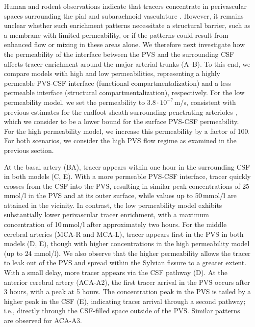 \documentclass[fleqn,10pt]{wlscirep}
\begin{document}
Human and rodent observations indicate that tracers concentrate in perivascular spaces surrounding the pial and subarachnoid vasculature \cite{zhang1990interrelationships,zhang1992directional, bedussi2017paravascular, mestre2018flow, bedussi2018paravascular, eide2024functional}. However, it remains unclear whether such enrichment patterns necessitate a structural barrier, such as a membrane with limited permeability, or if the patterns could result from enhanced flow or mixing in these areas alone. We therefore next investigate how the permeability of the interface between the PVS and the surrounding CSF affects tracer enrichment around the major arterial trunks (A--B). To this end, we compare models with high and low  permeabilities, representing a highly permeable PVS-CSF interface (functional compartmentalization) and a less permeable interface (structural compartmentalization), respectively. For the low permeability model, we set the permeability to $3.8 \cdot 10^{-7}\,$m/s, consistent with previous estimates for the endfoot sheath surrounding penetrating arterioles \cite{koch2023estimates}, which we consider to be a lower bound for the surface PVS-CSF permeability. For the high permeability model, we increase this permeability by a factor of 100. For both scenarios, we consider the high PVS flow regime as examined in the previous section.

At the basal artery (BA), tracer appears within one hour in the surrounding CSF in both models (C, E). With a more permeable PVS-CSF interface, tracer quickly crosses from the CSF into the PVS, resulting in similar peak concentrations of 25\,mmol/l in the PVS and at its outer surface, while values up to 50\,mmol/l are attained in the vicinity. In contrast, the low permeability model exhibits substantially lower perivascular tracer enrichment, with a maximum concentration of 10\,mmol/l after approximately two hours.
For the middle cerebral arteries (MCA-R and MCA-L), tracer appears
first in the PVS in both models (D, E),
though with higher concentrations in the high permeability model (up
to 24 mmol/l). We also observe that the higher permeability allows the
tracer to leak out of the PVS and spread within the Sylvian fissure to
a greater extent. With a small delay, more tracer appears via
  the CSF pathway (D). At the anterior cerebral artery (ACA-A2), the first tracer arrival in the PVS occurs after 3 hours, with a peak at 5 hours. The concentration peak in the PVS is tailed by a higher peak in the CSF (E), indicating tracer arrival through a second pathway; i.e., directly through the CSF-filled space outside of the PVS. Similar patterns are observed for ACA-A3.
\end{document}
